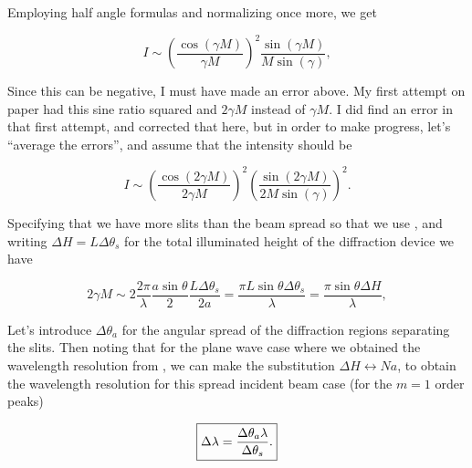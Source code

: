 {Employing half angle formulas and normalizing once more, we get

\begin{dmath}\label{eqn:modernOptics:problemSet3:3:900}
I \sim \left( \frac{\cos( \gamma M )}{\gamma M} \right)^2 \frac{\sin(\gamma M) }{ M \sin( \gamma)},
\end{dmath}

Since this can be negative, I must have made an error above.  My first attempt on paper had this sine ratio squared and $2 \gamma M$ instead of $\gamma M$.  I did find an error in that first attempt, and corrected that here, but in order to make progress, let's ``average the errors'', and assume that the intensity should be

\begin{dmath}\label{eqn:modernOptics:problemSet3:3:920}
I \sim \left( \frac{\cos( 2 \gamma M )}{2 \gamma M} \right)^2
\left( \frac{\sin(2 \gamma M) }{ 2 M \sin( \gamma)} \right)^2.
\end{dmath}

Specifying that we have more slits than the beam spread so that we use , and writing $\Delta H = L \Delta \theta_s$ for the total illuminated height of the diffraction device we have

\begin{dmath}\label{eqn:modernOptics:problemSet3:3:940}
2 \gamma M \sim
2 \frac{2 \pi}{\lambda} \frac{a \sin\theta}{2} \frac{L \Delta \theta_s}{2 a}
=
\frac{\pi L \sin\theta \Delta \theta_s}{\lambda}
=
\frac{\pi \sin\theta \Delta H}{\lambda},
\end{dmath}

Let's introduce $\Delta \theta_a$ for the angular spread of the diffraction regions separating the slits.  Then noting that for the plane wave case where we obtained the wavelength resolution  from , we can make the substitution $\Delta H \leftrightarrow N a$, to obtain the wavelength resolution for this spread incident beam case (for the $m = 1$ order peaks)

\begin{dmath}\label{eqn:modernOptics:problemSet3:3:960}
\myBoxed{
\Delta \lambda = \frac{\Delta \theta_a \lambda}{\Delta \theta_s}.
}
\end{dmath}

}
